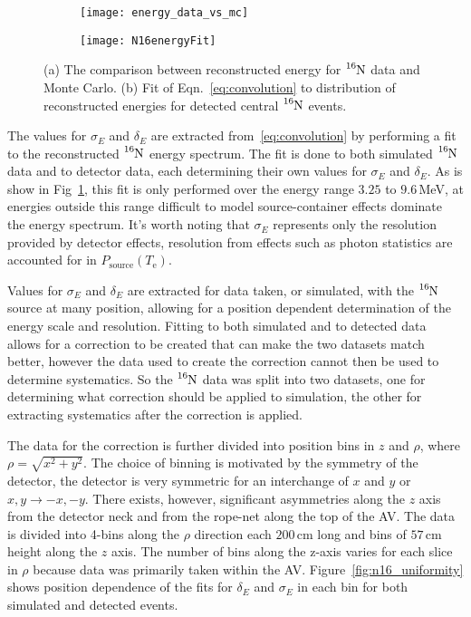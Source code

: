 \begin{figure}[htbp]
\centering
\begin{subfigure}{0.48\textwidth}
\centering
\texttt{[image: energy\_data\_vs\_mc]}
\caption[]{}
\end{subfigure}
\hfill
\begin{subfigure}{0.48\textwidth}
\centering
\texttt{[image: N16energyFit]}
\caption[]{}
\end{subfigure}
\caption[$\ce{^{16}N}$ Energy Comparisons]{ (a) The comparison between
reconstructed energy for $\ce{^{16}N}$ data and Monte Carlo.  (b) Fit of
Eqn.~\eqref{eq:convolution} to distribution of reconstructed energies for
detected central $\ce{^{16}N}$ events.}
\label{fig:n16_energy}
\end{figure}
The values for $\sigma_{E}$ and $\delta_{E}$ are extracted from~\eqref{eq:convolution}
by performing a fit to the reconstructed $\ce{^{16}N}$ energy spectrum.
The fit is done to both simulated $\ce{^{16}N}$ data and to detector data,
each determining their own values for $\sigma_{E}$ and $\delta_{E}$.
As is show in Fig~\ref{fig:n16_energy}, this fit is only performed
over the energy range $3.25$ to $9.6$\,MeV, at energies outside this range
difficult to model source-container effects dominate the energy spectrum.
It's worth noting that $\sigma_{E}$ represents only the resolution provided by detector
effects, resolution from effects such as photon statistics are accounted
for in $P_\mathrm{source}(T_{\mathrm{e}})$.

Values for $\sigma_{E}$ and $\delta_{E}$ are extracted for data taken, or simulated, with
the $\ce{^{16}N}$ source at many position, allowing for a position dependent
determination of the energy scale and resolution.
Fitting to both simulated and to detected data allows for a correction to
be created that can make the two datasets match better, however the data
used to create the correction cannot then be used to determine systematics.
So the $\ce{^{16}N}$ data was split into two datasets, one for determining
what correction should be applied to simulation, the other for extracting systematics
after the correction is applied.

The data for the correction is further divided into position bins in $z$ and
$\rho$, where $\rho = \sqrt{x^{2} + y^{2}}$. The choice of binning is motivated
by the symmetry of the detector, the detector is very symmetric for an interchange
of $x$ and $y$ or $x,y \rightarrow -x,-y$.
There exists, however, significant asymmetries along the $z$ axis
from the detector neck and from the rope-net along the top of the AV\@.
The data is divided into 4-bins along the $\rho$ direction each $200$\,cm long
and bins of $57$\,cm height along the $z$ axis. The number of bins along the
z-axis varies for each slice in $\rho$ because data was primarily taken within
the AV.\@
Figure~\ref{fig:n16_uniformity} shows position dependence of the fits for
$\delta_{E}$ and $\sigma_{E}$ in each bin for both simulated and detected
events.

